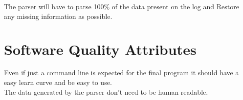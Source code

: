 \documentclass{scrreprt}
\begin{document}
The parser will have to parse 100\% of the data present on the log and Restore
any missing information as possible.\\

\section{Software Quality Attributes}
Even if just a command line is expected for the final program it should have a
easy learn curve and be easy to use.\\
The data generated by the parser don't need to be human readable.\\





\end{document}
